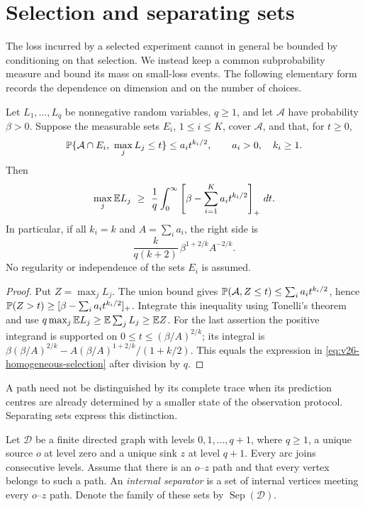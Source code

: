\section{Selection and separating sets}\label{sec:v26-selection}
The loss incurred by a selected experiment cannot in general be bounded
by conditioning on that selection. We instead keep a common
subprobability measure and bound its mass on small-loss events. The
following elementary form records the dependence on dimension and on
the number of choices.

\begin{lemma}\label{lem:v26-finite-selection}
Let $L_1,\ldots,L_q$ be nonnegative random variables, $q\ge1$, and
let $\mathcal A$ have probability $\beta>0$. Suppose the measurable
sets $E_i$, $1\le i\le K$, cover $\mathcal A$, and that, for $t\ge0$,
\[
 \mathbb P\{\mathcal A\cap E_i,\ \max_jL_j\le t\}
       \le a_i t^{k_i/2},\qquad a_i>0,\quad k_i\ge1.
\]
Then
\begin{equation}\label{eq:v26-finite-tail}
 \max_j\mathbb E L_j\ \ge\ \frac1q\int_0^\infty
              \left[\beta-\sum_{i=1}^K a_i t^{k_i/2}\right]_+\,dt.
\end{equation}
In particular, if all $k_i=k$ and $A=\sum_i a_i$, the right side is
\begin{equation}\label{eq:v26-homogeneous-selection}
 \frac{k}{q(k+2)}\,\beta^{1+2/k}A^{-2/k}.
\end{equation}
No regularity or independence of the sets $E_i$ is assumed.
\end{lemma}
\begin{proof}
Put $Z=\max_jL_j$. The union bound gives
$\mathbb P(\mathcal A,Z\le t)\le\sum_i a_i t^{k_i/2}$, hence
$\mathbb P(Z>t)\ge[\beta-\sum_i a_i t^{k_i/2}]_+$.
Integrate this inequality using Tonelli's theorem and use
$q\max_j\mathbb E L_j\ge\mathbb E\sum_jL_j\ge\mathbb E Z$.
For the last assertion the positive integrand is supported on
$0\le t\le(\beta/A)^{2/k}$; its integral is
$\beta(\beta/A)^{2/k}-A(\beta/A)^{1+2/k}/(1+k/2)$.
This equals the expression in \eqref{eq:v26-homogeneous-selection}
after division by $q$.
\end{proof}

A path need not be distinguished by its complete trace when its
prediction centres are already determined by a smaller state of the
observation protocol. Separating sets express this distinction.

Let $\mathscr D$ be a finite directed graph with levels
$0,1,\ldots,q+1$, where $q\ge1$, a unique source $o$ at level zero and a unique sink
$z$ at level $q+1$. Every arc joins consecutive levels. Assume that
there is an $o$--$z$ path and that every vertex belongs to such a path.
An \emph{internal separator} is a set of internal vertices meeting
every $o$--$z$ path. Denote the family of these sets by
$\operatorname{Sep}(\mathscr D)$.

